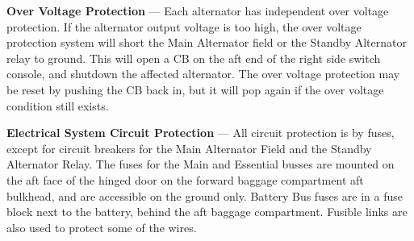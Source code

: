 \textbf{Over Voltage Protection} --- Each alternator has independent over voltage protection. If the alternator output voltage is too high, the over voltage protection system will short the Main Alternator field or the Standby Alternator relay to ground. This will open a CB on the aft end of the right side switch console, and shutdown the affected alternator. The over voltage protection may be reset by pushing the CB back in, but it will pop again if the over voltage condition still exists.

\textbf{Electrical System Circuit Protection} --- All circuit protection is by fuses, except for circuit breakers for the Main Alternator Field and the Standby Alternator Relay. The fuses for the Main and Essential busses are mounted on the aft face of the hinged door on the forward baggage compartment aft bulkhead, and are accessible on the ground only. Battery Bus fuses are in a fuse block next to the battery, behind the aft baggage compartment. Fusible links are also used to protect some of the wires.

